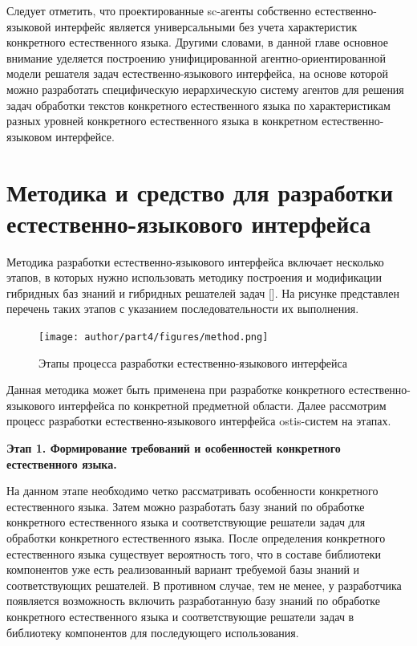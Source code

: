 Следует отметить, что проектированные sc-агенты собственно естественно-языковой интерфейс является универсальными без учета характеристик конкретного естественного языка. Другими словами, в данной главе основное внимание уделяется построению унифицированной агентно-ориентированной модели решателя задач естественно-языкового интерфейса, на основе которой можно разработать специфическую иерархическую систему агентов для решения задач обработки текстов конкретного естественного языка по характеристикам разных уровней конкретного естественного языка в конкретном естественно-языковом интерфейсе.
\section{Методика и средство для разработки естественно-языкового интерфейса}
Методика разработки естественно-языкового интерфейса включает несколько этапов, в которых нужно использовать методику построения и модификации гибридных баз знаний и гибридных решателей задач []. На рисунке \textit{} представлен перечень таких этапов с указанием последовательности их выполнения.
\begin{figure}[H]
	\centering
	\texttt{[image: author/part4/figures/method.png]}
	\caption{Этапы процесса разработки естественно-языкового интерфейса}
	\label{fig:method-interface}
\end{figure}

Данная методика может быть применена при разработке конкретного естественно-языкового интерфейса по конкретной предметной области. Далее рассмотрим процесс разработки естественно-языкового интерфейса ostis-систем на этапах.

\textbf{Этап 1. Формирование требований и особенностей конкретного естественного языка.}

На данном этапе необходимо четко рассматривать особенности конкретного естественного языка. Затем можно разработать базу знаний по обработке конкретного естественного языка и соответствующие решатели задач для обработки конкретного естественного языка. После определения конкретного естественного языка существует вероятность того, что в составе библиотеки компонентов уже есть реализованный вариант требуемой базы знаний и соответствующих решателей. В противном случае, тем не менее, у разработчика появляется возможность включить разработанную базу знаний по обработке конкретного естественного языка и соответствующие решатели задач в библиотеку компонентов для последующего использования.

